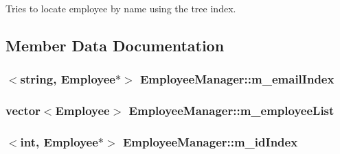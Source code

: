 Tries to locate employee by name using the tree index. 



\subsection{Member Data Documentation}
\subsubsection[{\texorpdfstring{m\+\_\+email\+Index}{m_emailIndex}}]{$<$string, {\bf Employee}$\ast$$>$ Employee\+Manager\+::m\+\_\+email\+Index\hspace{0.3cm}{\ttfamily [private]}}\hypertarget{classEmployeeManager_ad90730c90bb1229b5b489e20acec544f}{}\label{classEmployeeManager_ad90730c90bb1229b5b489e20acec544f}
\subsubsection[{\texorpdfstring{m\+\_\+employee\+List}{m_employeeList}}]{\setlength{\rightskip}{0pt plus 5cm}vector$<${\bf Employee}$>$ Employee\+Manager\+::m\+\_\+employee\+List\hspace{0.3cm}{\ttfamily [private]}}\hypertarget{classEmployeeManager_a5838e658d6a021dbdca4a4d8c5758db1}{}\label{classEmployeeManager_a5838e658d6a021dbdca4a4d8c5758db1}
\subsubsection[{\texorpdfstring{m\+\_\+id\+Index}{m_idIndex}}]{$<$int, {\bf Employee}$\ast$$>$ Employee\+Manager\+::m\+\_\+id\+Index\hspace{0.3cm}{\ttfamily [private]}}\hypertarget{classEmployeeManager_a7e325209532405be4bfb57f63aa65d7e}{}\label{classEmployeeManager_a7e325209532405be4bfb57f63aa65d7e}
